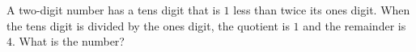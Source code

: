 A two-digit number has a tens digit that is $1$ less than twice its ones digit. When the tens digit is divided by the ones digit, the quotient is $1$ and the remainder is $4$. What is the number?

